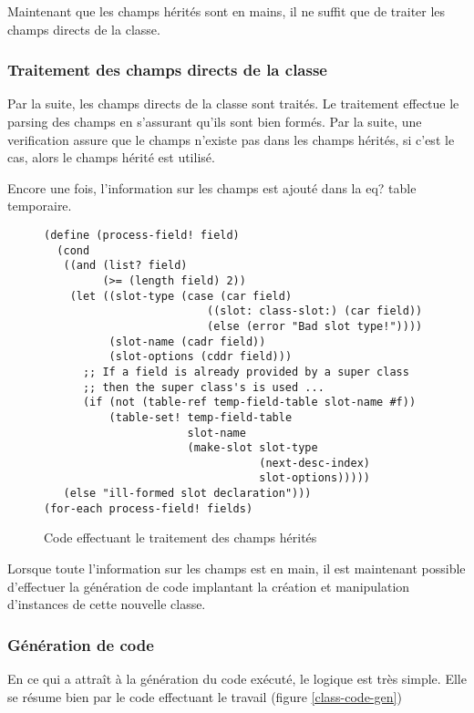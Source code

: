 \documentclass[letterpaper,12pt]{book}
\begin{document}
      Maintenant que les champs hérités sont en mains, il ne suffit que de
      traiter les champs directs de la classe.

    \subsubsection{Traitement des champs directs de la classe}
      Par la suite, les champs directs de la classe sont traités. Le
      traitement effectue le \og parsing \fg des champs en s'assurant
      qu'ils sont bien formés. Par la suite, une verification assure
      que le champs n'existe pas dans les champs hérités, si c'est le
      cas, alors le champs hérité est utilisé.

      Encore une fois, l'information sur les champs est ajouté dans la
      \og eq? table \fg temporaire.

      \begin{figure}[h!]
        \begin{lstlisting}
(define (process-field! field)
  (cond
   ((and (list? field)
         (>= (length field) 2))
    (let ((slot-type (case (car field)
                         ((slot: class-slot:) (car field))
                         (else (error "Bad slot type!"))))
          (slot-name (cadr field))
          (slot-options (cddr field)))
      ;; If a field is already provided by a super class
      ;; then the super class's is used ...
      (if (not (table-ref temp-field-table slot-name #f))
          (table-set! temp-field-table
                      slot-name
                      (make-slot slot-type
                                 (next-desc-index)
                                 slot-options)))))
   (else "ill-formed slot declaration")))
(for-each process-field! fields)
        \end{lstlisting}
        \caption{Code effectuant le traitement des champs hérités}
        \label{heritage-code}
      \end{figure}

      Lorsque toute l'information sur les champs est en main, il est
      maintenant possible d'effectuer la génération de code implantant
      la création et manipulation d'instances de cette nouvelle classe.

    \subsubsection{Génération de code}
      En ce qui a attraît à la génération du code exécuté, le logique
      est très simple. Elle se résume bien par le code effectuant le
      travail (figure \ref{class-code-gen})
\end{document}

